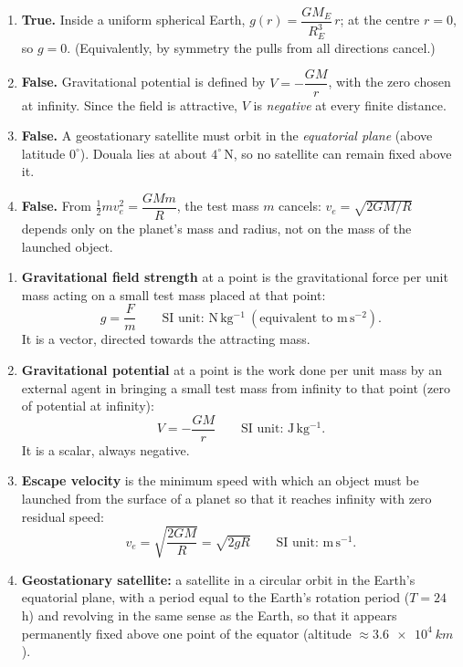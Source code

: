 \documentclass[11pt]{article}
\begin{document}
\begin{corrige}
\begin{enumerate}
\item \textbf{True.} Inside a uniform spherical Earth, $g(r) = \dfrac{GM_E}{R_E^3}\,r$; at the centre $r = 0$, so $g = 0$. (Equivalently, by symmetry the pulls from all directions cancel.)
\item \textbf{False.} Gravitational potential is defined by $V = -\dfrac{GM}{r}$, with the zero chosen at infinity. Since the field is attractive, $V$ is \emph{negative} at every finite distance.
\item \textbf{False.} A geostationary satellite must orbit in the \emph{equatorial plane} (above latitude $0^{\circ}$). Douala lies at about $4^{\circ}$\,N, so no satellite can remain fixed above it.
\item \textbf{False.} From $\frac12 m v_e^2 = \dfrac{GMm}{R}$, the test mass $m$ cancels: $v_e = \sqrt{2GM/R}$ depends only on the planet's mass and radius, not on the mass of the launched object.
\end{enumerate}
\end{corrige}

\begin{corrige}
\begin{enumerate}
\item \textbf{Gravitational field strength} at a point is the gravitational force per unit mass acting on a small test mass placed at that point:
\[ g = \frac{F}{m} \qquad \text{SI unit: } \mathrm{N\,kg^{-1}}\ (\text{equivalent to } \mathrm{m\,s^{-2}}). \]
It is a vector, directed towards the attracting mass.
\item \textbf{Gravitational potential} at a point is the work done per unit mass by an external agent in bringing a small test mass from infinity to that point (zero of potential at infinity):
\[ V = -\frac{GM}{r} \qquad \text{SI unit: } \mathrm{J\,kg^{-1}}. \]
It is a scalar, always negative.
\item \textbf{Escape velocity} is the minimum speed with which an object must be launched from the surface of a planet so that it reaches infinity with zero residual speed:
\[ v_e = \sqrt{\frac{2GM}{R}} = \sqrt{2gR} \qquad \text{SI unit: } \mathrm{m\,s^{-1}}. \]
\item \textbf{Geostationary satellite:} a satellite in a circular orbit in the Earth's equatorial plane, with a period equal to the Earth's rotation period ($T = 24$ h) and revolving in the same sense as the Earth, so that it appears permanently fixed above one point of the equator (altitude $\approx \SI{3.6e4}{km}$).
\end{enumerate}
\end{corrige}
\end{document}
